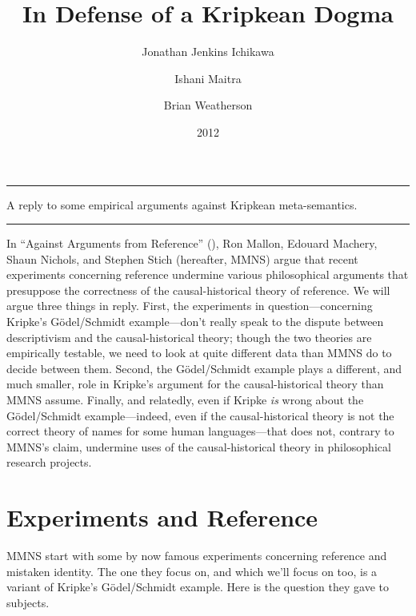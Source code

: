 \documentclass[
  10pt,
  letterpaper,
  DIV=11,
  numbers=noendperiod,
  twoside]{scrartcl}
\title{In Defense of a Kripkean Dogma}
\author{Jonathan Jenkins Ichikawa \and Ishani Maitra \and Brian
Weatherson}
\date{2012}
\renewenvironment{abstract}
 {\vspace{-1.25cm}
 \quotation\small\noindent\rule{\linewidth}{.5pt}\par\smallskip
 \noindent }
 {\par\noindent\rule{\linewidth}{.5pt}\endquotation}
\begin{document}
\maketitle
\begin{abstract}
A reply to some empirical arguments against Kripkean meta-semantics.
\end{abstract}

In ``Against Arguments from Reference'' (), Ron Mallon, Edouard Machery, Shaun Nichols, and Stephen
Stich (hereafter, MMNS) argue that recent experiments concerning
reference undermine various philosophical arguments that presuppose the
correctness of the causal-historical theory of reference. We will argue
three things in reply. First, the experiments in question---concerning
Kripke's Gödel/Schmidt example---don't really speak to the dispute
between descriptivism and the causal-historical theory; though the two
theories are empirically testable, we need to look at quite different
data than MMNS do to decide between them. Second, the Gödel/Schmidt
example plays a different, and much smaller, role in Kripke's argument
for the causal-historical theory than MMNS assume. Finally, and
relatedly, even if Kripke \emph{is} wrong about the Gödel/Schmidt
example---indeed, even if the causal-historical theory is not the
correct theory of names for some human languages---that does not,
contrary to MMNS's claim, undermine uses of the causal-historical theory
in philosophical research projects.

\section{Experiments and Reference}\label{experiments-and-reference}

MMNS start with some by now famous experiments concerning reference and
mistaken identity. The one they focus on, and which we'll focus on too,
is a variant of Kripke's Gödel/Schmidt example. Here is the question
they gave to subjects.
\end{document}
